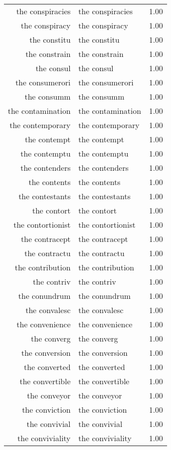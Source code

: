 \begin{table}[ht]
\begin{tabular}{rlr}
  the conspiracies & the conspiracies & 1.00 \\ 
  the conspiracy & the conspiracy & 1.00 \\ 
  the constitu & the constitu & 1.00 \\ 
  the constrain & the constrain & 1.00 \\ 
  the consul & the consul & 1.00 \\ 
  the consumerori & the consumerori & 1.00 \\ 
  the consumm & the consumm & 1.00 \\ 
  the contamination & the contamination & 1.00 \\ 
  the contemporary & the contemporary & 1.00 \\ 
  the contempt & the contempt & 1.00 \\ 
  the contemptu & the contemptu & 1.00 \\ 
  the contenders & the contenders & 1.00 \\ 
  the contents & the contents & 1.00 \\ 
  the contestants & the contestants & 1.00 \\ 
  the contort & the contort & 1.00 \\ 
  the contortionist & the contortionist & 1.00 \\ 
  the contracept & the contracept & 1.00 \\ 
  the contractu & the contractu & 1.00 \\ 
  the contribution & the contribution & 1.00 \\ 
  the contriv & the contriv & 1.00 \\ 
  the conundrum & the conundrum & 1.00 \\ 
  the convalesc & the convalesc & 1.00 \\ 
  the convenience & the convenience & 1.00 \\ 
  the converg & the converg & 1.00 \\ 
  the conversion & the conversion & 1.00 \\ 
  the converted & the converted & 1.00 \\ 
  the convertible & the convertible & 1.00 \\ 
  the conveyor & the conveyor & 1.00 \\ 
  the conviction & the conviction & 1.00 \\ 
  the convivial & the convivial & 1.00 \\ 
  the conviviality & the conviviality & 1.00 \\ 

\end{tabular}
\end{table}
